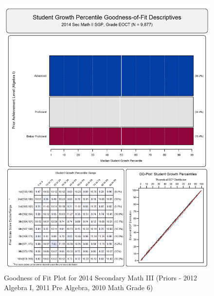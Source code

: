 \documentclass[12pt]{article}
\begin{document}
\begin{figure}[htbp]
\centering
\includegraphics{../img/Goodness_of_Fit/SEC_MATH_II.2014/2014_SEC_MATH_II_EOCT;2012_ALGEBRA_I_EOCT;2011_PRE_ALGEBRA_EOCT;2010_MATH_6.png}
\caption{Goodness of Fit Plot for 2014 Secondary Math III (Priors - 2012
Algebra I, 2011 Pre Algebra, 2010 Math Grade 6)}
\end{figure}
\end{document}
